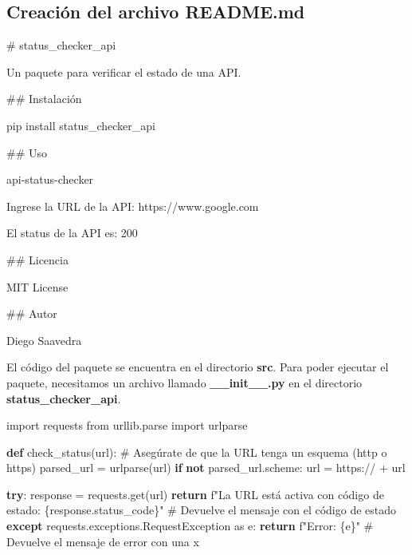 \documentclass[
  a4paper,
  DIV=11,
  numbers=noendperiod,
  onepage,
  openany]{scrreprt}
\newenvironment{Shaded}{\begin{snugshade}}{\end{snugshade}}
\newcommand{\CommentTok}[1]{\textcolor[rgb]{0.37,0.37,0.37}{#1}}
\newcommand{\ControlFlowTok}[1]{\textcolor[rgb]{0.00,0.23,0.31}{\textbf{#1}}}
\newcommand{\FunctionTok}[1]{\textcolor[rgb]{0.28,0.35,0.67}{#1}}
\newcommand{\ImportTok}[1]{\textcolor[rgb]{0.00,0.46,0.62}{#1}}
\newcommand{\KeywordTok}[1]{\textcolor[rgb]{0.00,0.23,0.31}{\textbf{#1}}}
\newcommand{\NormalTok}[1]{\textcolor[rgb]{0.00,0.23,0.31}{#1}}
\newcommand{\OperatorTok}[1]{\textcolor[rgb]{0.37,0.37,0.37}{#1}}
\newcommand{\SpecialCharTok}[1]{\textcolor[rgb]{0.37,0.37,0.37}{#1}}
\newcommand{\SpecialStringTok}[1]{\textcolor[rgb]{0.13,0.47,0.30}{#1}}
\newcommand{\StringTok}[1]{\textcolor[rgb]{0.13,0.47,0.30}{#1}}
\begin{document}
\begin{tcolorbox}
\chapter{Creación del archivo
README.md}\label{creaciuxf3n-del-archivo-readme.md}

\begin{Shaded}
\begin{Highlighting}[]
\FunctionTok{\# status\_checker\_api}

\NormalTok{Un paquete para verificar el estado de una API.}

\FunctionTok{\#\# Instalación}

\NormalTok{pip install status\_checker\_api}

\FunctionTok{\#\# Uso}

\NormalTok{api{-}status{-}checker}

\NormalTok{Ingrese la URL de la API: https://www.google.com}

\NormalTok{El status de la API es: 200}

\FunctionTok{\#\# Licencia}

\NormalTok{MIT License}

\FunctionTok{\#\# Autor}

\NormalTok{Diego Saavedra}
\end{Highlighting}
\end{Shaded}

El código del paquete se encuentra en el directorio \textbf{src}. Para
poder ejecutar el paquete, necesitamos un archivo llamado
\textbf{\_\_init\_\_.py} en el directorio \textbf{status\_checker\_api}.

\begin{Shaded}
\begin{Highlighting}[]
\ImportTok{import}\NormalTok{ requests}
\ImportTok{from}\NormalTok{ urllib.parse }\ImportTok{import}\NormalTok{ urlparse}

\KeywordTok{def}\NormalTok{ check\_status(url):}
    \CommentTok{\# Asegúrate de que la URL tenga un esquema (http o https)}
\NormalTok{    parsed\_url }\OperatorTok{=}\NormalTok{ urlparse(url)}
    \ControlFlowTok{if} \KeywordTok{not}\NormalTok{ parsed\_url.scheme:}
\NormalTok{        url }\OperatorTok{=} \StringTok{\textquotesingle{}https://\textquotesingle{}} \OperatorTok{+}\NormalTok{ url}
    
    \ControlFlowTok{try}\NormalTok{:}
\NormalTok{        response }\OperatorTok{=}\NormalTok{ requests.get(url)}
        \ControlFlowTok{return} \SpecialStringTok{f"La URL está activa con código de estado: }\SpecialCharTok{\{}\NormalTok{response}\SpecialCharTok{.}\NormalTok{status\_code}\SpecialCharTok{\}}\SpecialStringTok{"}  \CommentTok{\# Devuelve el mensaje con el código de estado}
    \ControlFlowTok{except}\NormalTok{ requests.exceptions.RequestException }\ImportTok{as}\NormalTok{ e:}
        \ControlFlowTok{return} \SpecialStringTok{f"Error: }\SpecialCharTok{\{}\NormalTok{e}\SpecialCharTok{\}}\SpecialStringTok{"}  \CommentTok{\# Devuelve el mensaje de error con una x}
\end{Highlighting}
\end{Shaded}


\end{tcolorbox}
\end{document}

